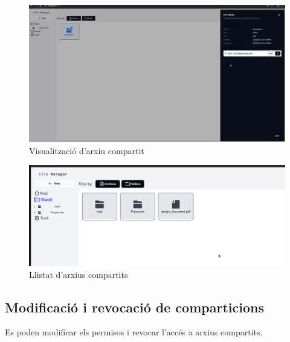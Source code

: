 \begin{figure}[H]
\centering
\includegraphics[width=0.8\linewidth]{Figures/implementacio/sharedFile.png}
\caption{Visualització d'arxiu compartit}
\label{fig:sharedFile}
\end{figure}

\begin{figure}[H]
\centering
\includegraphics[width=0.8\linewidth]{Figures/implementacio/sharedFiles.png}
\caption{Llistat d'arxius compartits}
\label{fig:sharedFiles}
\end{figure}

\subsection{Modificació i revocació de comparticions}

Es poden modificar els permisos i revocar l'accés a arxius compartits.

